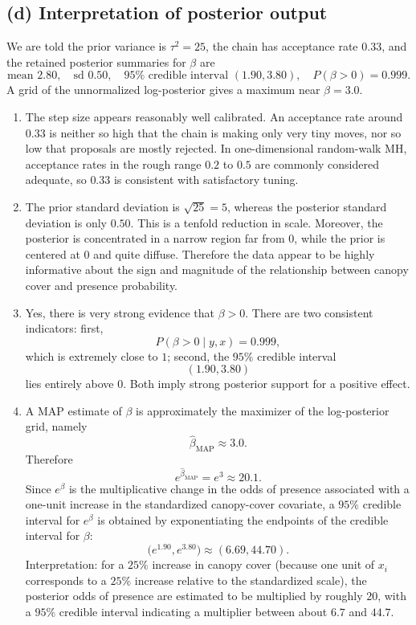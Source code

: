 \documentclass[11pt]{article}
\begin{document}
\subsection*{(d) Interpretation of posterior output}
We are told the prior variance is $\tau^2=25$, the chain has acceptance rate $0.33$, and the retained posterior summaries for $\beta$ are
\[
\text{mean }2.80,\quad \text{sd }0.50,\quad 95\%\text{ credible interval }(1.90,3.80),\quad P(\beta>0)=0.999.
\]
A grid of the unnormalized log-posterior gives a maximum near $\beta=3.0$.

\begin{enumerate}[label=\textit{\roman*.}]
\item The step size appears reasonably well calibrated. An acceptance rate around $0.33$ is neither so high that the chain is making only very tiny moves, nor so low that proposals are mostly rejected. In one-dimensional random-walk MH, acceptance rates in the rough range $0.2$ to $0.5$ are commonly considered adequate, so $0.33$ is consistent with satisfactory tuning.

\item The prior standard deviation is $\sqrt{25}=5$, whereas the posterior standard deviation is only $0.50$. This is a tenfold reduction in scale. Moreover, the posterior is concentrated in a narrow region far from $0$, while the prior is centered at $0$ and quite diffuse. Therefore the data appear to be highly informative about the sign and magnitude of the relationship between canopy cover and presence probability.

\item Yes, there is very strong evidence that $\beta>0$. There are two consistent indicators: first,
\[
P(\beta>0\mid y,x)=0.999,
\]
which is extremely close to $1$; second, the $95\%$ credible interval
\[
(1.90,3.80)
\]
lies entirely above $0$. Both imply strong posterior support for a positive effect.

\item A MAP estimate of $\beta$ is approximately the maximizer of the log-posterior grid, namely
\[
\hat\beta_{\mathrm{MAP}}\approx 3.0.
\]
Therefore
\[
e^{\hat\beta_{\mathrm{MAP}}}=e^3\approx 20.1.
\]
Since $e^\beta$ is the multiplicative change in the odds of presence associated with a one-unit increase in the standardized canopy-cover covariate, a $95\%$ credible interval for $e^\beta$ is obtained by exponentiating the endpoints of the credible interval for $\beta$:
\[
\bigl(e^{1.90},e^{3.80}\bigr)\approx(6.69,44.70).
\]
Interpretation: for a $25\%$ increase in canopy cover (because one unit of $x_i$ corresponds to a $25\%$ increase relative to the standardized scale), the posterior odds of presence are estimated to be multiplied by roughly $20$, with a $95\%$ credible interval indicating a multiplier between about $6.7$ and $44.7$.
\end{enumerate}
\end{document}
